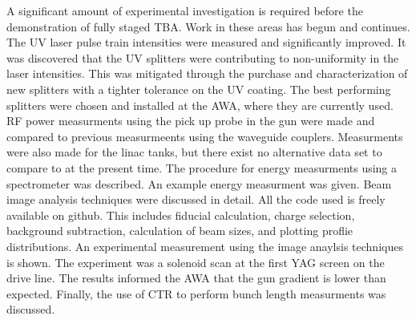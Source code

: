 A significant amount of experimental investigation is 
required before the demonstration of fully staged TBA.
Work in these areas has begun and continues. 
The UV laser pulse train intensities were measured and significantly improved.
It was discovered that the UV splitters were contributing to non-uniformity in the laser intensities. 
This was mitigated through the purchase and characterization of 
new splitters with a tighter tolerance on the UV coating. 
The best performing splitters were chosen and installed at the AWA, 
where they are currently used.
RF power measurments using the pick up probe in the gun were made and compared to previous 
measurmeents using the waveguide couplers. 
Measurments were also made for the linac tanks, but there exist no alternative data 
set to compare to at the present time.
The procedure for energy measurments using a spectrometer was described.
An example energy measurment was given.
Beam image analysis techniques were discussed in detail.
All the code used is freely available on github.
This includes fiducial calculation, charge selection, background subtraction, 
calculation of beam sizes, and plotting proflie distributions. 
An experimental measurement using the image anaylsis techniques is shown. 
The experiment was a solenoid scan at the first YAG screen on the drive line.
The results informed the AWA that the gun gradient is lower than expected.
Finally, the use of CTR to perform bunch length measurments was discussed.


